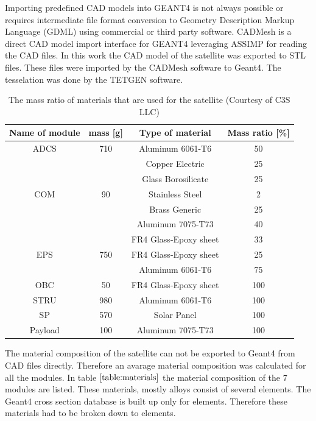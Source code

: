 \documentclass[12pt, a4paper,titlepage]{article}
\numberwithin{equation}{section}
\numberwithin{figure}{section}
\begin{document}
Importing predefined CAD models into GEANT4 is not always possible or requires intermediate file format conversion to Geometry Description Markup Language (GDML) using commercial or third party software. CADMesh \cite{cadmesh} is a direct CAD model import interface for GEANT4 leveraging ASSIMP \cite{assimp} for reading the CAD files. In this work the CAD model of the satellite was exported to STL files. These files were imported by the CADMesh software to Geant4. The tesselation was done by the TETGEN \cite{tetgen} software.

\begin{table}[h!]
\begin{center}
\begin{tabular}{ |c|c|c|c|} 
 \hline
 Name of module & mass [g] & Type of material & Mass ratio [\%]\\\hline
 ADCS &	710	& Aluminum 6061-T6 &	50\\
			& & Copper Electric	& 25 \\
			& &  Glass Borosilicate 	& 25\\\hline
COM	& 	90	& 	Stainless Steel 	& 2\\
			& 	& Brass Generic		& 25\\
			& 	& Aluminum 7075-T73		& 40\\
			& 	& FR4 Glass-Epoxy sheet	& 	33\\\hline
EPS	& 	750	& 	FR4 Glass-Epoxy sheet		& 25\\
			& 	& Aluminum 6061-T6		& 75\\\hline
OBC	&	50		& FR4 Glass-Epoxy sheet	& 	100\\\hline
STRU	& 	980		& Aluminum 6061-T6	& 	100\\\hline
SP	& 	570		& Solar Panel	& 	100\\\hline
Payload	& 	100	& 	Aluminum 7075-T73	& 	100\\
 \hline
\end{tabular}
\end{center}
\caption{The mass ratio of materials that are used for the satellite (Courtesy of C3S LLC) \cite{drawing}}
\label{table:materials}

\end{table}

\pagebreak

The material composition of the satellite can not be exported to Geant4 from CAD files directly. Therefore an avarage material composition was calculated for all the modules. In table $\ref{table:materials}$ the material composition of the 7 modules are listed. These materials, mostly alloys consist of several elements. The Geant4 cross section database is built up only for elements. Therefore these materials had to be broken down to elements.
\end{document}
